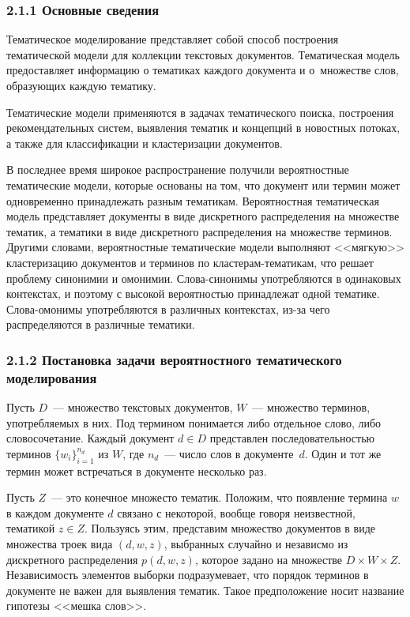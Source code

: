 \documentclass[a4paper]{report}
\begin{document}
	\subsubsection{2.1.1 Основные сведения}
	Тематическое моделирование представляет собой  способ построения тематической модели для коллекции текстовых документов. Тематическая модель предоставляет информацию о тематиках каждого документа и о~множестве слов, образующих каждую тематику. 
	
	Тематические модели применяются в задачах тематического поиска, построения рекомендательных систем, выявления тематик и концепций в новостных потоках, а также для классификации и кластеризации документов. 
	
	В последнее время широкое распространение получили вероятностные тематические модели, которые основаны на том, что документ или термин может одновременно принадлежать разным тематикам. Вероятностная тематическая модель представляет документы в виде дискретного распределения на множестве тематик, а тематики в виде дискретного распределения на множестве терминов. Другими словами, вероятностные тематические модели выполняют <<мягкую>> кластеризацию документов и терминов по кластерам-тематикам, что решает проблему синонимии и омонимии. Слова-синонимы употребляются в одинаковых контекстах, и поэтому с высокой вероятностью принадлежат одной тематике. Слова-омонимы употребляются в различных контекстах, из-за чего распределяются в различные тематики.
	
	
	\subsubsection{2.1.2 Постановка задачи вероятностного тематического моделирования}
	
	Пусть $D$~--- множество текстовых документов, $W$~--- множество терминов, употребляемых в них. Под термином понимается либо отдельное слово, либо словосочетание. Каждый документ $d \in D$ представлен последовательностью терминов 
	$ \{w_i\}_{i=1}^{n_d}$ из $W$, где $n_d$~--- число слов в документе~$d$.
	Один и тот же термин может встречаться в документе несколько раз.
	
	Пусть $Z$~--- это конечное множесто тематик. Положим, что появление термина $w$ в каждом документе $d$ связано с некоторой, вообще говоря неизвестной, тематикой $z \in Z$. Пользуясь этим, представим множество документов в виде множества троек вида $(d,w,z)$, выбранных случайно и независмо из дискретного распределения $p(d,w,z)$, которое задано на множестве $D \times W \times Z$. Независимость элементов выборки подразумевает, что порядок терминов в документе не важен для выявления тематик. Такое предположение носит название гипотезы <<мешка слов>>.
	
\end{document}
